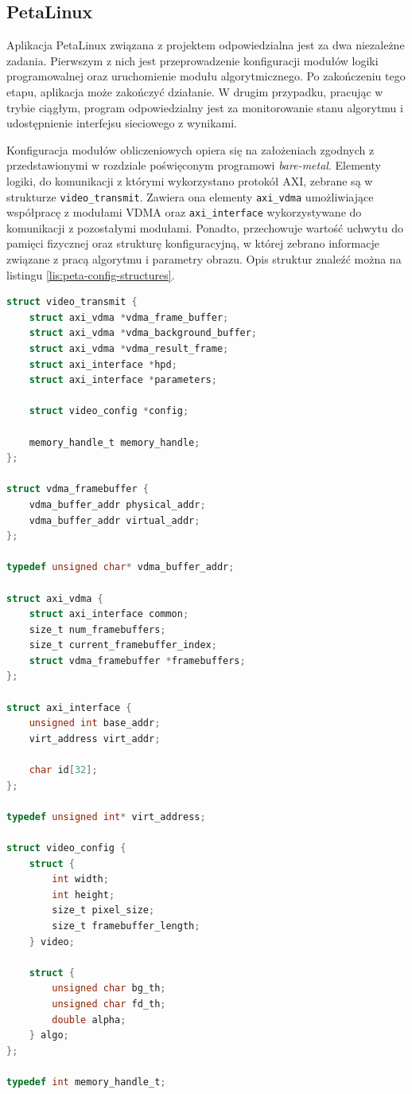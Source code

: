 \subsection{PetaLinux}

Aplikacja PetaLinux związana z projektem odpowiedzialna jest za dwa niezależne zadania. 
Pierwszym z nich jest przeprowadzenie konfiguracji modułów logiki programowalnej oraz uruchomienie modułu algorytmicznego. 
Po zakończeniu tego etapu, aplikacja może zakończyć działanie.
W drugim przypadku, pracując w trybie ciągłym, program odpowiedzialny jest za monitorowanie stanu algorytmu i udostępnienie interfejsu sieciowego z wynikami.

Konfiguracja modułów obliczeniowych opiera się na założeniach zgodnych z przedstawionymi w rozdziale poświęconym programowi \emph{bare-metal}.
Elementy logiki, do komunikacji z którymi wykorzystano protokół AXI, zebrane są w strukturze \texttt{video\_transmit}. 
Zawiera ona elementy \texttt{axi\_vdma} umożliwiające współpracę z modułami VDMA oraz \texttt{axi\_interface} wykorzystywane do komunikacji z pozostałymi modułami. 
Ponadto, przechowuje wartość uchwytu do pamięci fizycznej oraz strukturę konfiguracyjną, w której zebrano informacje związane z pracą algorytmu i parametry obrazu. 
Opis struktur znaleźć można na listingu \ref{lis:peta-config-structures}.

\begin{lstlisting}[breaklines,language=C, label=lis:peta-config-structures, caption=Struktury konfiguracyjne aplikacji.]
struct video_transmit {
	struct axi_vdma *vdma_frame_buffer;
	struct axi_vdma *vdma_background_buffer;
	struct axi_vdma *vdma_result_frame;
	struct axi_interface *hpd;
	struct axi_interface *parameters;
	
	struct video_config *config;
	
	memory_handle_t memory_handle;
};

struct vdma_framebuffer {
	vdma_buffer_addr physical_addr;
	vdma_buffer_addr virtual_addr;
};

typedef unsigned char* vdma_buffer_addr;

struct axi_vdma {
	struct axi_interface common;
	size_t num_framebuffers;
	size_t current_framebuffer_index;
	struct vdma_framebuffer *framebuffers;
};

struct axi_interface {
	unsigned int base_addr;
	virt_address virt_addr;
	
	char id[32];
};

typedef unsigned int* virt_address;

struct video_config {
	struct {
		int width;
		int height;
		size_t pixel_size;
		size_t framebuffer_length;
	} video;

	struct {
		unsigned char bg_th;
		unsigned char fd_th;
		double alpha;
	} algo;
};

typedef int memory_handle_t;

\end{lstlisting}

